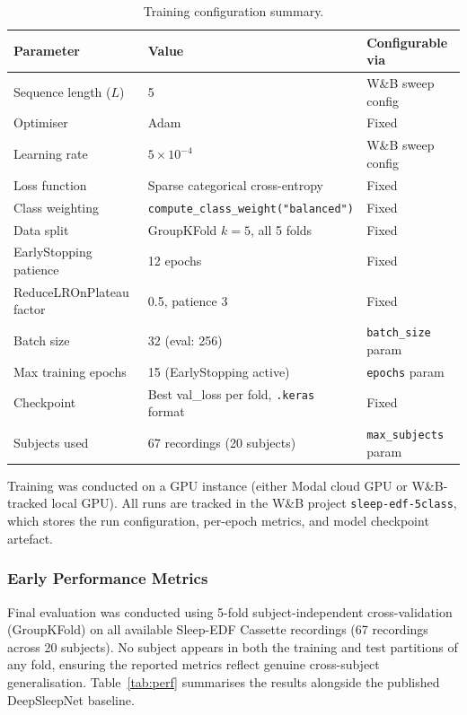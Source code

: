 \documentclass[10pt]{article}
\begin{document}
\begin{table}[h]
\centering
\small
\renewcommand{\arraystretch}{1.2}
\begin{tabular}{|l|l|l|}
\hline
\textbf{Parameter} & \textbf{Value} & \textbf{Configurable via} \\\hline
Sequence length ($L$) & 5 & W\&B sweep config \\\hline
Optimiser & Adam & Fixed \\\hline
Learning rate & $5 \times 10^{-4}$ & W\&B sweep config \\\hline
Loss function & Sparse categorical cross-entropy & Fixed \\\hline
Class weighting & \texttt{compute\_class\_weight("balanced")} & Fixed \\\hline
Data split & GroupKFold $k=5$, all 5 folds & Fixed \\\hline
EarlyStopping patience & 12 epochs & Fixed \\\hline
ReduceLROnPlateau factor & 0.5, patience 3 & Fixed \\\hline
Batch size & 32 (eval: 256) & \texttt{batch\_size} param \\\hline
Max training epochs & 15 (EarlyStopping active) & \texttt{epochs} param \\\hline
Checkpoint & Best val\_loss per fold, \texttt{.keras} format & Fixed \\\hline
Subjects used & 67 recordings (20 subjects) & \texttt{max\_subjects} param \\\hline
\end{tabular}
\caption{Training configuration summary.}
\label{tab:training-config}
\end{table}

Training was conducted on a GPU instance (either Modal cloud GPU or W\&B-tracked local GPU). All runs are tracked in the W\&B project \texttt{sleep-edf-5class}, which stores the run configuration, per-epoch metrics, and model checkpoint artefact.

\subsubsection{Early Performance Metrics}
\label{sec:performanceMetrics}

Final evaluation was conducted using 5-fold subject-independent cross-validation (GroupKFold) on all available Sleep-EDF Cassette recordings (67 recordings across 20 subjects). No subject appears in both the training and test partitions of any fold, ensuring the reported metrics reflect genuine cross-subject generalisation. Table~\ref{tab:perf} summarises the results alongside the published DeepSleepNet baseline.
\end{document}
